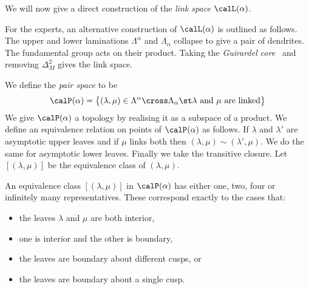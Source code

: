 \documentclass[12pt]{amsart}
\begin{document}
We will now give a direct construction of the \emph{link space} $\calL(\alpha)$.

\begin{remark}
For the experts, an alternative construction of $\calL(\alpha)$ is outlined as follows. The upper and lower laminations $\Lambda^\alpha$ and $\Lambda_\alpha$ collapse to give a pair of dendrites. The fundamental group acts on their product.  Taking the \emph{Guirardel core}~\cite{Guirardel05} and removing $\Delta_M^2$ gives the link space. 
\end{remark}

We define the \emph{pair space} to be
\[
\calP(\alpha)  = \big\{ (\lambda, \mu) \in \Lambda^\alpha \cross \Lambda_\alpha \st \mbox{$\lambda$ and $\mu$ are linked} \big\}
\]
We give $\calP(\alpha)$ a topology by realising it as a subspace of a product.  We define an equivalence relation on points of $\calP(\alpha)$ as follows.  If $\lambda$ and $\lambda'$ are asymptotic upper leaves and if $\mu$ links both then $(\lambda, \mu) \sim (\lambda', \mu)$.  We do the same for asymptotic lower leaves.  Finally we take the transitive closure.  Let $[(\lambda,\mu)]$ be the equivalence class of $(\lambda,\mu)$.

\begin{lemma}
\label{Lem:EquivalenceInL}
An equivalence class $[(\lambda,\mu)]$ in $\calP(\alpha)$ has either one, two, four or infinitely many representatives. These correspond exactly to the cases that:
\begin{itemize}
\item the leaves $\lambda$ and $\mu$ are both interior,
\item one is interior and the other is boundary,
\item the leaves are boundary about different cusps, or
\item the leaves are boundary about a single cusp.
\end{itemize}
\end{lemma}
\end{document}
